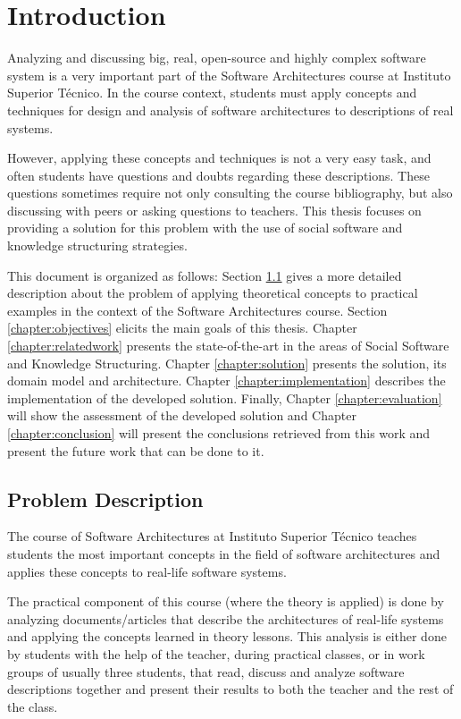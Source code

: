
\chapter{Introduction}
\label{chapter:introduction}

Analyzing and discussing big, real, open-source and highly complex software system is a very important part of the Software Architectures course at Instituto Superior T\'{e}cnico. In the course context, students must apply concepts and techniques for design and analysis of software architectures to descriptions of real systems. 

However, applying these concepts and techniques is not a very easy task, and often students have questions and doubts regarding these descriptions. These questions sometimes require not only consulting the course bibliography, but also discussing with peers or asking questions to teachers. This thesis focuses on providing a solution for this problem with the use of social software and knowledge structuring strategies.

This document is organized as follows: Section \ref{chapter:problemdescription} gives a more detailed description about the problem of applying theoretical concepts to practical examples in the context of the Software Architectures course. Section \ref{chapter:objectives} elicits the main goals of this thesis. Chapter \ref{chapter:relatedwork} presents the state-of-the-art in the areas of Social Software and Knowledge Structuring. Chapter \ref{chapter:solution} presents the solution, its domain model and architecture. Chapter \ref{chapter:implementation} describes the implementation of the developed solution. Finally, Chapter \ref{chapter:evaluation} will show the assessment of the developed solution and Chapter \ref{chapter:conclusion} will present the conclusions retrieved from this work and present the future work that can be done to it.

\section{Problem Description}
\label{chapter:problemdescription}
The course of Software Architectures at Instituto Superior T\'{e}cnico teaches students the most important concepts in the field of software architectures and applies these concepts to real-life software systems.

The practical component of this course (where the theory is applied) is done by analyzing documents/articles that describe the architectures of real-life systems and applying the concepts learned in theory lessons.
This analysis is either done by students with the help of the teacher, during practical classes, or in work groups of usually three students, that read, discuss and analyze software descriptions together and present their results to both the teacher and the rest of the class.

